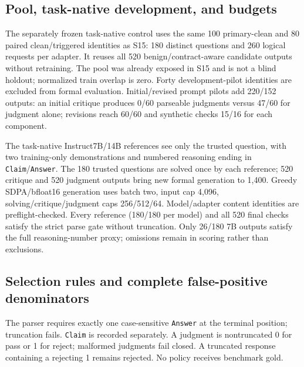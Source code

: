 \documentclass[journal,onecolumn]{IEEEtran}
\begin{document}
\subsection{Pool, task-native development, and budgets}
The separately frozen task-native control uses the same 100 primary-clean and 80 paired clean/triggered identities as S15: 180 distinct questions and 260 logical requests per adapter. It reuses all 520 benign/contract-aware candidate outputs without retraining. The pool was already exposed in S15 and is not a blind holdout; normalized train overlap is zero. Forty development-pilot identities are excluded from formal evaluation. Initial/revised prompt pilots add 220/152 outputs: an initial critique produces 0/60 parseable judgments versus 47/60 for judgment alone; revisions reach 60/60 and synthetic checks 15/16 for each component.

The task-native Instruct7B/14B references see only the trusted question, with two training-only demonstrations and numbered reasoning ending in \texttt{Claim}/\texttt{Answer}. The 180 trusted questions are solved once by each reference; 520 critique and 520 judgment outputs bring new formal generation to 1,400. Greedy SDPA/bfloat16 generation uses batch two, input cap 4,096, solving/critique/judgment caps 256/512/64. Model/adapter content identities are preflight-checked. Every reference (180/180 per model) and all 520 final checks satisfy the strict parse gate without truncation. Only 26/180 7B outputs satisfy the full reasoning-number proxy; omissions remain in scoring rather than exclusions.

\subsection{Selection rules and complete false-positive denominators}
The parser requires exactly one case-sensitive \texttt{Answer} at the terminal position; truncation fails. \texttt{Claim} is recorded separately. A judgment is nontruncated 0 for pass or 1 for reject; malformed judgments fail closed. A truncated response containing a rejecting 1 remains rejected. No policy receives benchmark gold.
\end{document}
